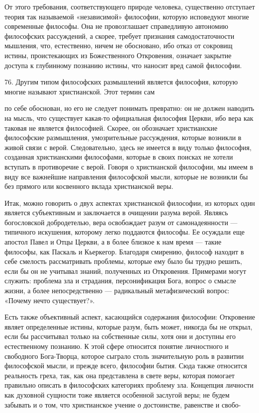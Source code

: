 \documentclass[a5paper,10pt]{article}
\begin{document}
От этого требования, соответствующего природе человека, существенно отступает
теория так называемой «независимой» философии, которую исповедуют многие
современные философы. Она не провозглашает справедливую автономию философских
рассуждений, а скорее, требует признания самодостаточности мышления, что,
естественно, ничем не обосновано, ибо отказ от сокровищ истины, проистекающих
из Божественного Откровения, означает закрытие доступа к глубинному познанию
истины, что наносит вред самой философии.

76. Другим типом философских размышлений является философия, которую многие
называют христианской. Этот термин сам

по себе обоснован, но его не следует понимать превратно: он не должен наводить
на мысль, что существует какая-то официальная философия Церкви, ибо вера как
таковая не является философией. Скорее, он обозначает христианские философские
размышления, умозрительные рассуждения, которые возникли в живой связи с верой.
Следовательно, здесь не имеется в виду только философия, созданная
христианскими философами, которые в своих поисках не хотели вступать в
противоречие с верой. Говоря о христианской философии, мы имеем в виду все
важнейшие направления философской мысли, которые не возникли бы без прямого или
косвенного вклада христианской веры.

Итак, можно говорить о двух аспектах христианской философии, из которых один
является субъективным и заключается в очищении разума верой. Являясь
богословской добродетелью, вера освобождает разум от самонадеянности —
типичного искушения, которому легко поддаются философы. Ее осуждали еще апостол
Павел и Отцы Церкви, а в более близкое к нам время — такие философы, как
Паскаль и Кьеркегор. Благодаря смирению, философ находит в себе смелость
рассматривать проблемы, которые ему было бы трудно решить, если бы он не
учитывал знаний, полученных из Откровения. Примерами могут служить: проблема
зла и страдания, персонификация Бога, вопрос о смысле жизни, а более
непосредственно — радикальный метафизический вопрос: «Почему нечто
существует?».

Есть также объективный аспект, касающийся содержания философии: Откровение
являет определенные истины, которые разум, быть может, никогда бы не открыл,
если бы рассчитывал только на собственные силы, хотя они и доступны его
естественному познанию. К этой сфере относится понятие личностного и свободного
Бога-Творца, которое сыграло столь значительную роль в развитии философской
мысли, и прежде всего, философии бытия. Сюда также относится реальность греха,
так, как она представлена в свете веры, которая помогает правильно описать в
философских категориях проблему зла. Концепция личности как духовной сущности
тоже является особенной заслугой веры; не будем забывать и о том, что
христианское учение о достоинстве, равенстве и свобо-
\end{document}
